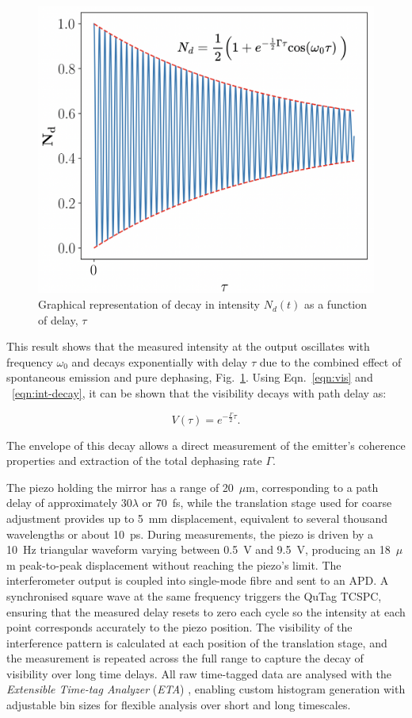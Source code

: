 \begin{figure}[h!]
    \centering
    \includegraphics[width=0.8\linewidth]{Figures/VisDecay.png}
    \caption{Graphical representation of decay in intensity  $N_d(t)$ as a function of delay, $\tau$}
    \label{fig:visdecay}
\end{figure}


This result shows that the measured intensity at the output oscillates with frequency $\omega_0$ and decays exponentially with delay $\tau$ due to the combined effect of spontaneous emission and pure dephasing, Fig.~\ref{fig:visdecay}. Using Eqn.~\ref{eqn:vis} and ~\ref{eqn:int-decay}, it can be shown that the visibility decays with path delay as:

\begin{equation}
    V(\tau)=e^{-\frac{\Gamma}{2}\tau}.
    \label{eqn:vis-decay}
\end{equation}

The envelope of this decay allows a direct measurement of the emitter's coherence properties and extraction of the total dephasing rate $\Gamma$.

The piezo holding the mirror has a range of 20~$\mu$m, corresponding to a path delay of approximately $30\lambda$ or 70~fs, while the translation stage used for coarse adjustment provides up to 5~mm displacement, equivalent to several thousand wavelengths or about 10~ps. During measurements, the piezo is driven by a 10~Hz triangular waveform varying between 0.5~V and 9.5~V, producing an 18~$\mu$m peak-to-peak displacement without reaching the piezo’s limit. The interferometer output is coupled into single-mode fibre and sent to an APD. A synchronised square wave at the same frequency triggers the QuTag TCSPC, ensuring that the measured delay resets to zero each cycle so the intensity at each point corresponds accurately to the piezo position. The visibility of the interference pattern is calculated at each position of the translation stage, and the measurement is repeated across the full range to capture the decay of visibility over long time delays. All raw time-tagged data are analysed with the \textit{Extensible Time-tag Analyzer} (\textit{ETA}) \cite{Lin2021}, enabling custom histogram generation with adjustable bin sizes for flexible analysis over short and long timescales.



